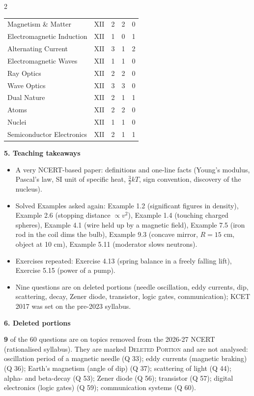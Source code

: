 \begin{multicols}{2}
{\begin{tabular}{@{}p{4.7cm}c@{\,}r@{\,}r@{\,}r@{}}
Magnetism \& Matter & XII & 2 & 2 & 0\\
Electromagnetic Induction & XII & 1 & 0 & 1\\
Alternating Current & XII & 3 & 1 & 2\\
Electromagnetic Waves & XII & 1 & 1 & 0\\
Ray Optics & XII & 2 & 2 & 0\\
Wave Optics & XII & 3 & 3 & 0\\
Dual Nature & XII & 2 & 1 & 1\\
Atoms & XII & 2 & 2 & 0\\
Nuclei & XII & 1 & 1 & 0\\
Semiconductor Electronics & XII & 2 & 1 & 1\\
\bottomrule\end{tabular}}\par\medskip
\textbf{\color{crimson}5. Teaching takeaways}\par\smallskip
{\footnotesize\begin{itemize}[leftmargin=1em,nosep]
\item A very NCERT-based paper: definitions and one-line facts (Young's modulus, Pascal's law, SI unit of specific heat, $\frac32kT$, sign convention, discovery of the nucleus).
\item Solved Examples asked again: Example 1.2 (significant figures in density), Example 2.6 (stopping distance $\propto v^2$), Example 1.4 (touching charged spheres), Example 4.1 (wire held up by a magnetic field), Example 7.5 (iron rod in the coil dims the bulb), Example 9.3 (concave mirror, $R=15$ cm, object at 10 cm), Example 5.11 (moderator slows neutrons).
\item Exercises repeated: Exercise 4.13 (spring balance in a freely falling lift), Exercise 5.15 (power of a pump).
\item Nine questions are on deleted portions (needle oscillation, eddy currents, dip, scattering, decay, Zener diode, transistor, logic gates, communication); KCET 2017 was set on the pre-2023 syllabus.
\end{itemize}}\par\medskip
\textbf{\color{crimson}6. Deleted portions}\par\smallskip
\textbf{9} of the 60 questions are on topics removed from the 2026-27 NCERT (rationalised syllabus). They are marked \textsc{Deleted Portion} and are not analysed: oscillation period of a magnetic needle (Q 33); eddy currents (magnetic braking) (Q 36); Earth's magnetism (angle of dip) (Q 37); scattering of light (Q 44); alpha- and beta-decay (Q 53); Zener diode (Q 56); transistor (Q 57); digital electronics (logic gates) (Q 59); communication systems (Q 60).\par
\end{multicols}








